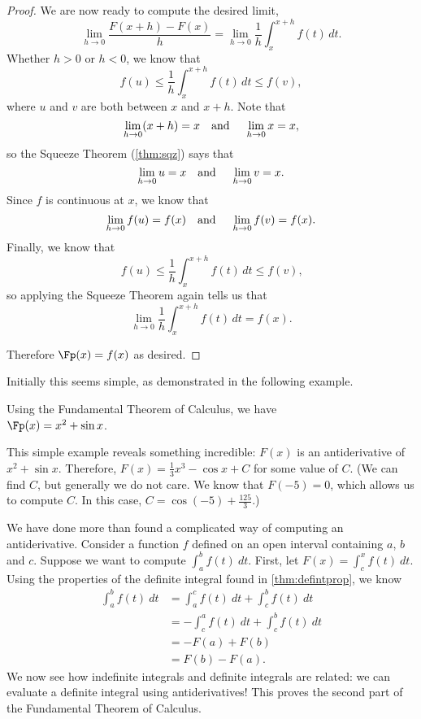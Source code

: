 \begin{proof}
We are now ready to compute the desired limit,
\[\lim_{h\to 0}\frac{F(x+h)-F(x)}{h}=\lim_{h\to 0}\frac1h\int_x^{x+h} f(t)\,dt.\]
Whether $h>0$ or $h<0$, we know that
\[f(u)\leq \frac1h\int_x^{x+h} f(t)\,dt\leq f(v),\]
where $u$ and $v$ are both between $x$ and $x+h$. Note that 
\[\lim_{h\to 0} (x+h)=x \text{\quad and \quad} \lim_{h\to 0} x=x,\]
so the Squeeze Theorem (\autoref{thm:sqz}) says that
\[\lim_{h\to 0}u=x \text{\quad and \quad} \lim_{h\to 0} v=x.\]
Since $f$ is continuous at $x$, we know that
\[\lim_{h\to 0} f(u)=f(x)\text{\quad and \quad} \lim_{h\to 0}f(v)=f(x).\]
Finally, we know that
\[f(u)\leq \frac1h \int_x^{x+h} f(t)\,dt\leq f(v)\text{,}\]
so applying the Squeeze Theorem again tells us that
\[\lim_{h\to 0}\frac1h\int_x^{x+h} f(t)\,dt=f(x).\] 

Therefore $\Fp(x)=f(x)$ as desired.
\end{proof}


Initially this seems simple, as demonstrated in the following example.

{Using the Fundamental Theorem of Calculus, we have\\
$\Fp(x) = x^2+\sin x$.}

This simple example reveals something incredible: $F(x)$ is an antiderivative of $x^2+\sin x$. Therefore, $F(x) = \frac13x^3-\cos x+C$ for some value of $C$. (We can find $C$, but generally we do not care. We know that $F(-5)=0$, which allows us to compute $C$. In this case, $C=\cos(-5)+\frac{125}3$.)

We have done more than found a complicated way of computing an antiderivative. Consider a function $f$ defined on an open interval containing $a$, $b$ and $c$. Suppose we want to compute $\int_a^b f(t)\ dt$. First, let $F(x) = \int_c^x f(t)\ dt$. Using the properties of the definite integral found in \autoref{thm:defintprop}, we know 
\begin{align*}
	\int_a^b f(t)\ dt
	&= \int_a^c f(t)\ dt + \int_c^b f(t)\ dt \\
	&= -\int_c^a f(t)\ dt + \int_c^b f(t)\ dt \\
	&=-F(a) + F(b)\\
	&= F(b) - F(a).
\end{align*}
We now see how indefinite integrals and definite integrals are related: we can evaluate a definite integral using antiderivatives! This proves the second part of the Fundamental Theorem of Calculus.

